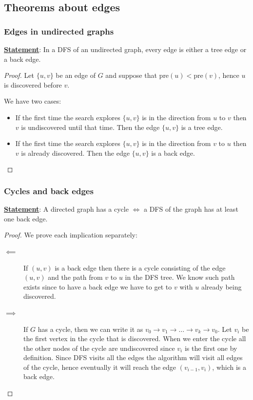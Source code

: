 \documentclass[12pt]{extarticle}
\begin{document}
\subsection{Theorems about edges}

\subsubsection{Edges in undirected graphs}

\textbf{\underline{Statement}}: In a DFS of an undirected graph, every edge is either a tree edge or a back edge.

\begin{proof}
    Let $\{u, v\}$ be an edge of $G$ and suppose that $\text{pre}(u) < \text{pre}(v)$, hence $u$ is discovered before $v$.

    We have two cases:

    \begin{itemize}
        \item If the first time the search explores $\{u, v\}$ is in the direction from $u$ to $v$ then $v$ is undiscovered until that time.
              Then the edge $\{u, v\}$ is a tree edge.
        \item If the first time the search explores $\{u, v\}$ is in the direction from $v$ to $u$ then $v$ is already discovered.
              Then the edge $\{u, v\}$ is a back edge.
    \end{itemize}
\end{proof}

\subsubsection{Cycles and back edges}

\textbf{\underline{Statement}}: A directed graph has a cycle $\iff$ a DFS of the graph has at least one back edge.

\begin{proof}
    We prove each implication separately:

    \begin{description}
        \item[$\impliedby$] If $(u, v)$ is a back edge then there is a cycle consisting of the edge $(u, v)$ and the path from $v$ to $u$ in the DFS tree. We know such path exists since to have a back edge we have to get to $v$ with $u$ already being discovered.
        \item[$\implies$] If $G$ has a cycle, then we can write it as $v_0 \to v_1 \to \dots \to v_k \to v_0$.
            Let $v_i$ be the first vertex in the cycle that is discovered.
            When we enter the cycle all the other nodes of the cycle are undiscovered since $v_i$ is the first one by definition. Since DFS visits all the  edges the algorithm will visit all edges of the cycle, hence eventually it will reach the edge $(v_{i-1}, v_i)$, which is a back edge.
    \end{description}
\end{proof}
\end{document}

